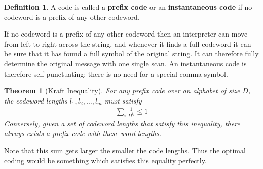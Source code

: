\documentclass{article}
\theoremstyle{definition}
\newtheorem{definition}{Definition}[section]
\theoremstyle{plain}
\newtheorem{theorem}{Theorem}[section]
\begin{document}
\begin{definition}
	A code is called a \textbf{prefix code} or an \textbf{instantaneous code} if no codeword is a prefix of any other codeword. 
\end{definition}
If no codeword is a prefix of any other codeword then an interpreter can move from left to right across the string, and whenever it finds a full codeword it can be sure that it has found a full symbol of the original string. It can therefore fully determine the original message with one single scan. An instantaneous code is therefore self-punctuating; there is no need for a special comma symbol.
\begin{theorem}[Kraft Inequality]
	For any prefix code over an alphabet of size $D$, the codeword lengths $l_1,l_2,\ldots,l_m$ must satisfy 
	\begin{align}
		\sum_i \frac{1}{D^{l_i}} \leq 1
	\end{align}
Conversely, given a set of codeword lengths that satisfy this inequality, there always exists a prefix code with these word lengths. 
\end{theorem}
Note that this sum gets larger the smaller the code lengths. Thus the optimal coding would be something which satisfies this equality perfectly. 
\end{document}
